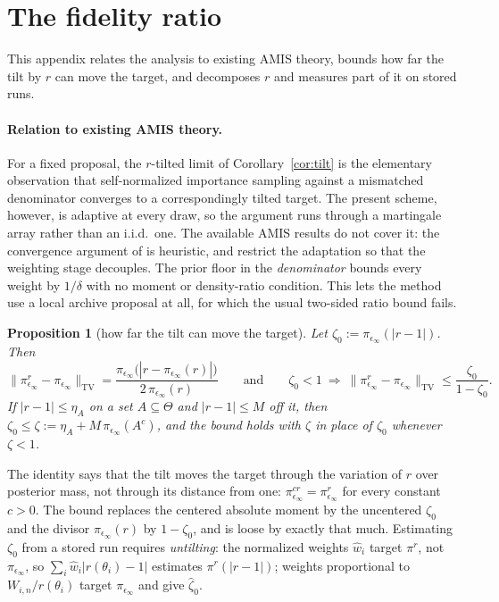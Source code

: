 \documentclass[10pt]{article}
\theoremstyle{plain}
\newtheorem{proposition}[theorem]{Proposition}
\theoremstyle{definition}
\begin{document}



\appendix

\section{The fidelity ratio}\label{app:theory-more}
This appendix relates the analysis to existing AMIS theory, bounds how far the tilt by $r$ can move the target, and decomposes $r$ and measures part of it on stored runs.

\paragraph{Relation to existing AMIS theory.} For a fixed proposal, the $r$-tilted limit of Corollary~\ref{cor:tilt} is the elementary observation that self-normalized importance sampling against a mismatched denominator converges to a correspondingly tilted target. The present scheme, however, is adaptive at every draw, so the argument runs through a martingale array rather than an i.i.d.\ one. The available AMIS results do not cover it: the convergence argument of \citet{cornuet2012amis} is heuristic, and \citet{marin2019consistency} restrict the adaptation so that the weighting stage decouples. The prior floor in the \emph{denominator} bounds every weight by $1/\delta$ with no moment or density-ratio condition. This lets the method use a local archive proposal at all, for which the usual two-sided ratio bound fails.

\begin{proposition}[how far the tilt can move the target]\label{prop:tilt}
Let $\zeta_0:=\pi_{\epsilon_\infty}(|r-1|)$. Then
\begin{equation}
\bigl\|\pi^r_{\epsilon_\infty}-\pi_{\epsilon_\infty}\bigr\|_{\mathrm{TV}}
=\frac{\pi_{\epsilon_\infty}\bigl(|r-\pi_{\epsilon_\infty}(r)|\bigr)}{2\,\pi_{\epsilon_\infty}(r)}
\qquad\text{and}\qquad
\zeta_0<1\ \Longrightarrow\ \bigl\|\pi^r_{\epsilon_\infty}-\pi_{\epsilon_\infty}\bigr\|_{\mathrm{TV}}\le\frac{\zeta_0}{1-\zeta_0}.
\label{eq:tilt-bound}
\end{equation}
If $|r-1|\le\eta_A$ on a set $A\subseteq\Theta$ and $|r-1|\le M$ off it, then $\zeta_0\le\zeta:=\eta_A+M\,\pi_{\epsilon_\infty}(A^c)$, and the bound holds with $\zeta$ in place of $\zeta_0$ whenever $\zeta<1$.
\end{proposition}
The identity says that the tilt moves the target through the variation of $r$ over posterior mass, not through its distance from one: $\pi^{cr}_{\epsilon_\infty}=\pi^r_{\epsilon_\infty}$ for every constant $c>0$. The bound replaces the centered absolute moment by the uncentered $\zeta_0$ and the divisor $\pi_{\epsilon_\infty}(r)$ by $1-\zeta_0$, and is loose by exactly that much. Estimating $\zeta_0$ from a stored run requires \emph{untilting}: the normalized weights $\widehat w_i$ target $\pi^r$, not $\pi_{\epsilon_\infty}$, so $\sum_i\widehat w_i|r(\theta_i)-1|$ estimates $\pi^r(|r-1|)$; weights proportional to $W_{i,n}/r(\theta_i)$ target $\pi_{\epsilon_\infty}$ and give $\widehat\zeta_0$.
\end{document}
